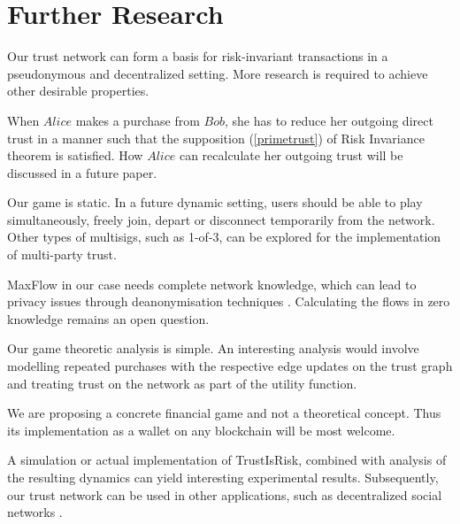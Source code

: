 \section{Further Research}

  Our trust network can form a basis for risk-invariant transactions in a pseudonymous and decentralized setting. More
  research is required to achieve other desirable properties.

  When $Alice$ makes a purchase from $Bob$, she has to reduce her outgoing direct trust in a manner such that the
  supposition (\ref{primetrust}) of Risk Invariance theorem is satisfied. How $Alice$ can recalculate her outgoing
  trust will be discussed in a future paper.

  Our game is static. In a future dynamic setting, users should be able to play simultaneously, freely join, depart or
  disconnect temporarily from the network. Other types of multisigs, such as 1-of-3, can be explored for the
  implementation of multi-party trust.

  MaxFlow in our case needs complete network knowledge, which can lead to privacy issues through deanonymisation
  techniques \cite{deanonymisation}. Calculating the flows in zero knowledge remains an open question.

  Our game theoretic analysis is simple. An interesting analysis would involve modelling repeated purchases with the
  respective edge updates on the trust graph and treating trust on the network as part of the utility function.

  We are proposing a concrete financial game and not a theoretical concept. Thus its implementation as a wallet on any
  blockchain will be most welcome.

  A simulation or actual implementation of TrustIsRisk, combined with analysis of the resulting dynamics can yield
  interesting experimental results. Subsequently, our trust network can be used in other applications, such as decentralized
  social networks \cite{synereo}.

